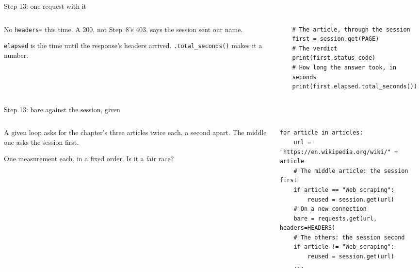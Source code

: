 \documentclass[9pt,aspectratio=169]{beamer}
\begin{document}
\begin{frame}[fragile]{Step 13: one request with it}
    \begin{columns}[T]
        \begin{column}{0.37\textwidth}
            No \texttt{headers=} this time. A 200, not Step~8's 403, says the session sent our name.

            \medskip
            \texttt{elapsed} is the time until the response's headers arrived. \texttt{.total\_seconds()} makes it a number.
        \end{column}
        \begin{column}{0.6\textwidth}
\begin{lstlisting}[style=lab]
# The article, through the session
first = session.get(PAGE)
# The verdict
print(first.status_code)
# How long the answer took, in seconds
print(first.elapsed.total_seconds())
\end{lstlisting}
        \end{column}
    \end{columns}
\end{frame}

\begin{frame}[fragile]{Step 13: bare against the session, given}
    \begin{columns}[T]
        \begin{column}{0.37\textwidth}
            A given loop asks for the chapter's three articles twice each, a second apart. The middle one asks the session first.

            \medskip
            One measurement each, in a fixed order. Is it a fair race?
        \end{column}
        \begin{column}{0.6\textwidth}
\begin{lstlisting}[style=lab]
for article in articles:
    url = "https://en.wikipedia.org/wiki/" + article
    # The middle article: the session first
    if article == "Web_scraping":
        reused = session.get(url)
    # On a new connection
    bare = requests.get(url, headers=HEADERS)
    # The others: the session second
    if article != "Web_scraping":
        reused = session.get(url)
    ...
\end{lstlisting}
        \end{column}
    \end{columns}
\end{frame}
\end{document}
